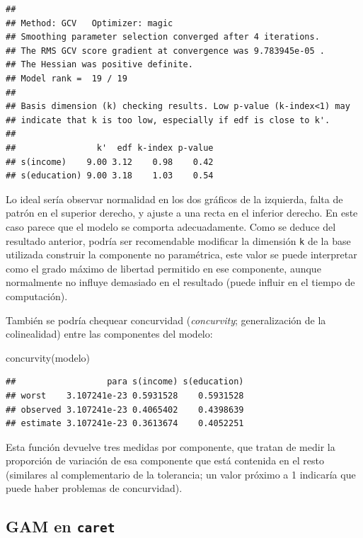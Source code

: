 \documentclass[
]{book}
\newenvironment{Shaded}{\begin{snugshade}}{\end{snugshade}}
\newcommand{\FunctionTok}[1]{\textcolor[rgb]{0.00,0.00,0.00}{#1}}
\newcommand{\NormalTok}[1]{#1}
\theoremstyle{break}
\theoremstyle{definition}
\theoremstyle{definition}
\theoremstyle{definition}
\theoremstyle{definition}
\theoremstyle{remark}
\begin{document}
\begin{verbatim}
## 
## Method: GCV   Optimizer: magic
## Smoothing parameter selection converged after 4 iterations.
## The RMS GCV score gradient at convergence was 9.783945e-05 .
## The Hessian was positive definite.
## Model rank =  19 / 19 
## 
## Basis dimension (k) checking results. Low p-value (k-index<1) may
## indicate that k is too low, especially if edf is close to k'.
## 
##                k'  edf k-index p-value
## s(income)    9.00 3.12    0.98    0.42
## s(education) 9.00 3.18    1.03    0.54
\end{verbatim}

Lo ideal sería observar normalidad en los dos gráficos de la izquierda, falta de patrón en el superior derecho, y ajuste a una recta en el inferior derecho. En este caso parece que el modelo se comporta adecuadamente.
Como se deduce del resultado anterior, podría ser recomendable modificar la dimensión \texttt{k} de la base utilizada construir la componente no paramétrica, este valor se puede interpretar como el grado máximo de libertad permitido en ese componente, aunque normalmente no influye demasiado en el resultado (puede influir en el tiempo de computación).

También se podría chequear concurvidad (\emph{concurvity}; generalización de la colinealidad) entre las componentes del modelo:

\begin{Shaded}
\begin{Highlighting}[]
\FunctionTok{concurvity}\NormalTok{(modelo)}
\end{Highlighting}
\end{Shaded}

\begin{verbatim}
##                  para s(income) s(education)
## worst    3.107241e-23 0.5931528    0.5931528
## observed 3.107241e-23 0.4065402    0.4398639
## estimate 3.107241e-23 0.3613674    0.4052251
\end{verbatim}

Esta función devuelve tres medidas por componente, que tratan de medir la proporción de variación de esa componente que está contenida en el resto (similares al complementario de la tolerancia; un valor próximo a 1 indicaría que puede haber problemas de concurvidad).

\hypertarget{gam-en-caret}{%
\subsection{\texorpdfstring{GAM en \texttt{caret}}{GAM en caret}}\label{gam-en-caret}}
\end{document}
